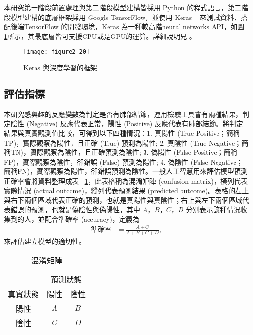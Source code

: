 \documentclass[12pt, a4paper]{article} 				%
\begin{document}
本研究第一階段前置處理與第二階段模型建構皆採用 Python 的程式語言，第二階段模型建構的底層框架採用 Google TensorFlow，並使用 Keras ~\cite{chollet2015keras} 來測試資料，搭配後端TensorFlow 的開發環境，Keras 為一種較高階neural networks API，如圖 \ref{Figure2-20}所示，其最底層皆可支援CPU或是GPU的運算。詳細說明見 \cite{Chen2018}。
\begin{figure}[!ht]
\begin{center}
\texttt{[image: figure2-20]}
\caption{Keras 與深度學習的框架}\label{Figure2-20}
\end{center}
\end{figure}

\subsection{評估指標}
本研究感興趣的反應變數為判定是否有肺部結節，運用檢驗工具會有兩種結果，判定陰性 (Negative) 反應代表正常，陽性 (Positive) 反應代表有肺部結節。將判定結果與真實觀測值比較，可得到以下四種情況：1. 真陽性 (True Positive；簡稱TP)，實際觀察為陽性，且正確 (True) 預測為陽性; 2. 真陰性 (True Negative；簡稱TN)，實際觀察為陰性，且正確預測為陰性; 3. 偽陽性 (False Positive；簡稱FP)，實際觀察為陰性，卻錯誤 (False) 預測為陽性; 4. 偽陰性 (False Negative；簡稱FN)，實際觀察為陽性，卻錯誤預測為陰性。一般人工智慧用來評估模型預測正確率會將資料整理成表 ~\ref{Table2-1}，此表格稱為混淆矩陣 (confusion matrix)，橫列代表實際情況 (actual outcome)，縱列代表預測結果 (predicted outcome)。表格的左上與右下兩個區域代表正確的預測，也就是真陽性與真陰性；右上與左下兩個區域代表錯誤的預測，也就是偽陰性與偽陽性，其中 $A$，$B$，$C$，$D$ 分別表示該種情況收集到的人，並配合準確率 (accuracy)，定義為
 \begin{align}
\mbox{準確率}&=\frac{A+C}{A+B+C+D},
 \end{align}
來評估建立模型的適切性。

\begin{table}[!ht]
\begin{center}
\caption{混淆矩陣}\label{Table2-1}
\begin{tabular}{ccc}\toprule
              & \multicolumn{2}{c}{預測狀態}\\
真實狀態 & 陽性 & 陰性\\\midrule
陽性       &  $A$ & $B$ \\
陰性       &  $C$ & $D$ \\\bottomrule
\end{tabular}
\end{center}
\end{table}
\end{document}
